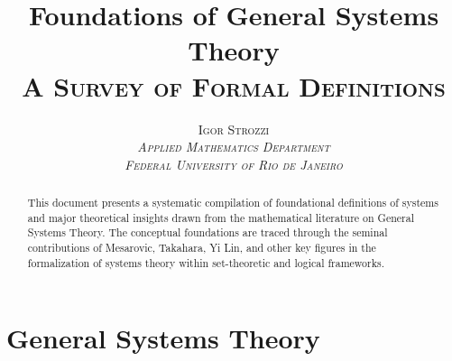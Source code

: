 \documentclass[a4paper,12pt]{article}
\title{Foundations of General Systems Theory\\
\small \scshape A Survey of Formal Definitions}
\author{\scshape Igor Strozzi \\ \small \itshape Applied Mathematics Department \\ \small Federal University of Rio de Janeiro}
\date{}
\begin{document}
\maketitle

\begin{abstract}
This document presents a systematic compilation of foundational definitions of systems and major theoretical insights drawn from the mathematical literature on General Systems Theory. The conceptual foundations are traced through the seminal contributions of Mesarovic, Takahara, Yi Lin, and other key figures in the formalization of systems theory within set-theoretic and logical frameworks.
\end{abstract}

\tableofcontents

\newpage

\section{General Systems Theory}






\end{document}

